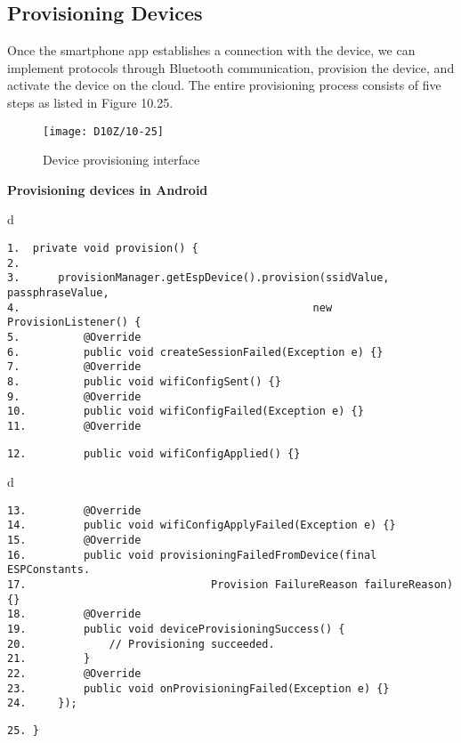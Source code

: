 \documentclass[a4paper,12pt]{book}
\begin{document}
\subsection{Provisioning Devices}
Once the smartphone app establishes a connection with the device, we can implement protocols through Bluetooth communication, provision the device, and activate the device on the cloud. The entire provisioning process consists of five steps as listed in Figure 10.25.

\begin{figure}[ht]
    \centering
    \texttt{[image: D10Z/10-25]}
    \caption{Device provisioning interface}
\end{figure}

\textbf{Provisioning devices in Android}


\begin{codebloc}
\begin{tabular}{d}
\vspace{2pt}
\begin{verbatim}
1.  private void provision() {
2.
3.      provisionManager.getEspDevice().provision(ssidValue, passphraseValue,
4.                                              new ProvisionListener() {
5.          @Override
6.          public void createSessionFailed(Exception e) {}
7.          @Override
8.          public void wifiConfigSent() {}
9.          @Override
10.         public void wifiConfigFailed(Exception e) {}
11.         @Override
\end{verbatim}
\verb|12.         public void wifiConfigApplied() {}|
\end{tabular}
\end{codebloc}

\begin{codebloc}
\begin{tabular}{d}
\vspace{2pt}
\begin{verbatim}
13.         @Override
14.         public void wifiConfigApplyFailed(Exception e) {}
15.         @Override
16.         public void provisioningFailedFromDevice(final ESPConstants.
17.                             Provision FailureReason failureReason) {}
18.         @Override
19.         public void deviceProvisioningSuccess() {
20.             // Provisioning succeeded.
21.         }
22.         @Override
23.         public void onProvisioningFailed(Exception e) {}
24.     });
\end{verbatim}
\verb|25. }|
\end{tabular}
\end{codebloc}
\end{document}
